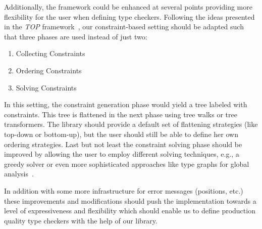 Additionally, the framework could be enhanced at several points
providing more flexibility for the user when defining type
checkers. Following the ideas presented in the \textit{TOP}
framework~\cite{Heeren2005}, our constraint-based setting should be
adapted such that three phases are used instead of just two:

\begin{enumerate}
\item Collecting Constraints
\item Ordering Constraints
\item Solving Constraints
\end{enumerate}

In this setting, the constraint generation phase would yield a tree
labeled with constraints. This tree is flattened in the next phase
using tree walks or tree transformers. The library should provide a
default set of flattening strategies (like top-down or bottom-up), but
the user should still be able to define her own ordering strategies.
Last but not least the constraint solving phase should be improved by
allowing the user to employ different solving techniques, e.g., a
greedy solver or even more sophisticated approaches like type graphs
for global analysis~\cite{Heeren2003a,Hage2005}.

In addition with some more infrastructure for error messages
(positions, etc.) these improvements and modifications should push the
implementation towards a level of expressiveness and flexibility which
should enable us to define production quality type checkers with the
help of our library.
